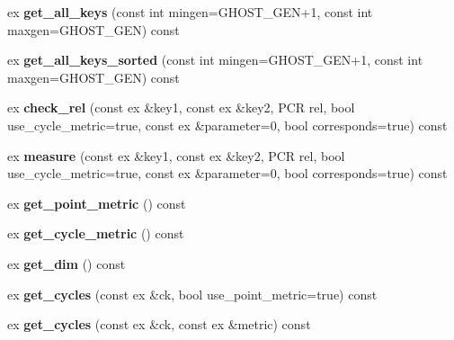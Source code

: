 \begin{DoxyCompactItemize}
\mbox{\label{class_moeb_inv_1_1figure_af05982b7f29f59b3e96bd0f504cecd8a}} 
ex {\bfseries get\+\_\+all\+\_\+keys} (const int mingen=G\+H\+O\+S\+T\+\_\+\+G\+EN+1, const int maxgen=G\+H\+O\+S\+T\+\_\+\+G\+EN) const
\item 
\mbox{\label{class_moeb_inv_1_1figure_a2084e2b6f9cd2d72f5530d75740c19a0}} 
ex {\bfseries get\+\_\+all\+\_\+keys\+\_\+sorted} (const int mingen=G\+H\+O\+S\+T\+\_\+\+G\+EN+1, const int maxgen=G\+H\+O\+S\+T\+\_\+\+G\+EN) const
\item 
\mbox{\label{class_moeb_inv_1_1figure_ab827587a502d370aa9bbe4f6b4a39a41}} 
ex {\bfseries check\+\_\+rel} (const ex \&key1, const ex \&key2, P\+CR rel, bool use\+\_\+cycle\+\_\+metric=true, const ex \&parameter=0, bool corresponds=true) const
\item 
\mbox{\label{class_moeb_inv_1_1figure_a4299a8cea895415be403a1af4235e229}} 
ex {\bfseries measure} (const ex \&key1, const ex \&key2, P\+CR rel, bool use\+\_\+cycle\+\_\+metric=true, const ex \&parameter=0, bool corresponds=true) const
\item 
\mbox{\label{class_moeb_inv_1_1figure_a5ade947eee85eec41f2766b794878798}} 
ex {\bfseries get\+\_\+point\+\_\+metric} () const
\item 
\mbox{\label{class_moeb_inv_1_1figure_abb2c58d729dcdf4beb0b25fda11cf6fe}} 
ex {\bfseries get\+\_\+cycle\+\_\+metric} () const
\item 
\mbox{\label{class_moeb_inv_1_1figure_a1b245cd72aaf9524d34adc30b23ed76c}} 
ex {\bfseries get\+\_\+dim} () const
\item 
\mbox{\label{class_moeb_inv_1_1figure_abf7111f3e5b2fe4dda176144f01147fc}} 
ex {\bfseries get\+\_\+cycles} (const ex \&ck, bool use\+\_\+point\+\_\+metric=true) const
\item 
\mbox{\label{class_moeb_inv_1_1figure_a3c7c1244afb27e63ec11307accad90c9}} 
ex {\bfseries get\+\_\+cycles} (const ex \&ck, const ex \&metric) const

\end{DoxyCompactItemize}
